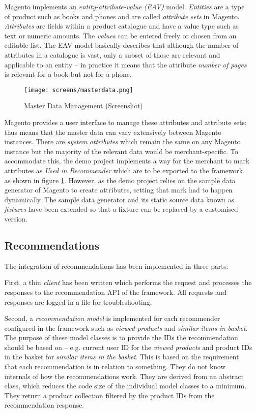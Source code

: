 Magento implements an \emph{entity-attribute-value (EAV)} model. \emph{Entities} are a type of product such as books and phones and are called \emph{attribute sets} in Magento. \emph{Attributes} are fields within a product catalogue and have a value type such as text or numeric amounts. The \emph{values} can be entered freely or chosen from an editable list. The EAV model basically describes that although the number of attributes in a catalogue is vast, only a subset of those are relevant and applicable to an entity -- in practice it means that the attribute \emph{number of pages} is relevant for a book but not for a phone.

\begin{figure}[!ht]
    \texttt{[image: screens/masterdata.png]}
    \caption{Master Data Management (Screenshot)}
    \label{fig:implementation-magento-master-data}
\end{figure}

Magento provides a user interface to manage these attributes and attribute sets; thus means that the master data can vary extensively between Magento instances. There are \emph{system attributes} which remain the same on any Magento instance but the majority of the relevant data would be merchant-specific. To accommodate this, the demo project implements a way for the merchant to mark attributes as \emph{Used in Recommender} which are to be exported to the framework, as shown in figure \ref{fig:implementation-magento-master-data}. However, as the demo project relies on the sample data generator of Magento to create attributes, setting that mark had to happen dynamically. The sample data generator and its static source data known as \emph{fixtures} have been extended so that a fixture can be replaced by a customised version.

\subsection{Recommendations}

The integration of recommendations has been implemented in three parts:

First, a thin \emph{client} has been written which performs the request and processes the responses to the recommendation API of the framework. All requests and responses are logged in a file for troubleshooting.

Second, a \emph{recommendation model} is implemented for each recommender configured in the framework such as \emph{viewed products} and \emph{similar items in basket}. The purpose of these model classes is to provide the IDs the recommendation should be based on -- e.g. current user ID for the \emph{viewed products} and product IDs in the basket for \emph{similar items in the basket}. This is based on the requirement that each recommendation is in relation to something. They do not know internals of how the recommendations work. They are derived from an abstract class, which reduces the code size of the individual model classes to a minimum. They return a product collection filtered by the product IDs from the recommendation response.

